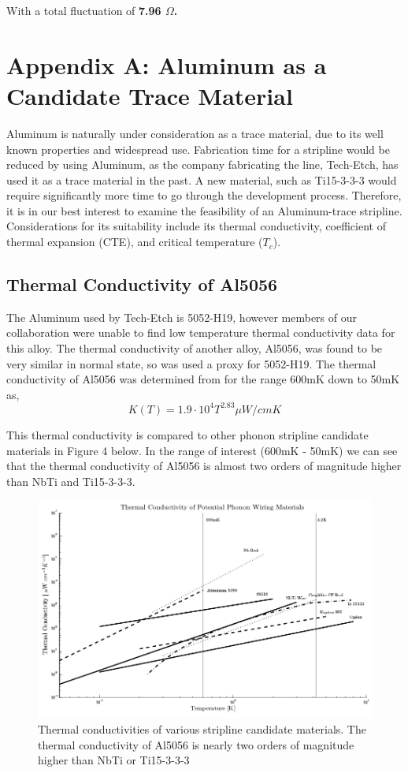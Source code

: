 \documentclass{report}
\begin{document}
\noindent With a total fluctuation of \bf{7.96 $\Omega$}.


\restoregeometry

\section{Appendix A: Aluminum as a Candidate Trace Material}

Aluminum is naturally under consideration as a trace material, due to its well known properties and widespread use. Fabrication time for a stripline would be reduced by using Aluminum, as the company fabricating the line, Tech-Etch, has used it as a trace material in the past. A new material, such as Ti15-3-3-3 would require significantly more time to go through the development process. Therefore, it is in our best interest to examine the feasibility of an Aluminum-trace stripline. Considerations for its suitability include its thermal conductivity, coefficient of thermal expansion (CTE), and critical temperature ($T_{c}$).

\subsection{Thermal Conductivity of Al5056}

The Aluminum used by Tech-Etch is 5052-H19, however members of our collaboration were unable to find low temperature thermal conductivity data for this alloy. The thermal conductivity of another alloy, Al5056, was found to be very similar in normal state, so was used a proxy for 5052-H19. The thermal conductivity of Al5056 was determined from \cite{coc} for the range 600mK down to 50mK as,
\begin{equation}
K(T) = 1.9 \cdot 10^{4} T^{2.83} \mu W/cmK
\end{equation}

This thermal conductivity is compared to other phonon stripline candidate materials in Figure 4 below. In the range of interest (600mK - 50mK) we can see that the thermal conductivity of Al5056 is almost two orders of magnitude higher than NbTi and Ti15-3-3-3.

\begin{figure}[h]
\includegraphics[width = .87\textwidth]{Cable_Therm_Graph.png}
\caption{Thermal conductivities of various stripline candidate materials. The thermal conductivity of Al5056 is nearly two orders of magnitude higher than NbTi or Ti15-3-3-3}
\end{figure}
\end{document}
